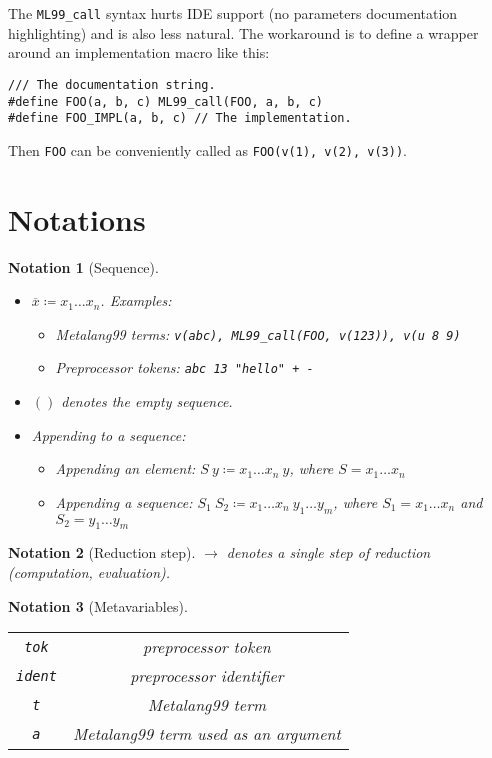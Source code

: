 \documentclass[12pt]{article}
\theoremstyle{break}
\newtheorem{notation}{Notation}
\begin{document}
The \texttt{ML99\_call} syntax hurts IDE support (no parameters documentation highlighting) and is also
less natural. The workaround is to define a wrapper around an implementation macro like this:

\begin{verbatim}
/// The documentation string.
#define FOO(a, b, c) ML99_call(FOO, a, b, c)
#define FOO_IMPL(a, b, c) // The implementation.
\end{verbatim}

Then \texttt{FOO} can be conveniently called as \texttt{FOO(v(1), v(2), v(3))}.

\section{Notations}

\begin{notation}[Sequence]
    \begin{itemize}
        \item $\overline{x} \coloneqq x_1 \ldots x_n$. Examples:
        \begin{itemize}
            \item Metalang99 terms: \texttt{v(abc), ML99\_call(FOO, v(123)), v(u 8 9)}
            \item Preprocessor tokens: \texttt{abc 13 "hello" + -}
        \end{itemize}
        \item $()$ denotes the empty sequence.
        \item Appending to a sequence:
        \begin{itemize}
            \item Appending an element: $S \ y \coloneqq x_1 \ldots x_n \ y$, where $S = x_1 \ldots x_n$
            \item Appending a sequence: $S_1 \ S_2 \coloneqq x_1 \ldots x_n \ y_1 \ldots y_m$, where $S_1 = x_1 \ldots x_n$
            and $S_2 = y_1 \ldots y_m$
        \end{itemize}
    \end{itemize}
\end{notation}

\begin{notation}[Reduction step]
    $\to$ denotes a single step of reduction (computation, evaluation).
\end{notation}

\begin{notation}[Metavariables]
    \ \\
    \begin{tabular}{|c|c|}
        \hline
        \texttt{tok} & preprocessor token \\
        \texttt{ident} & preprocessor identifier \\
        \texttt{t} & Metalang99 term \\
        \texttt{a} & Metalang99 term used as an argument \\
        \hline
    \end{tabular}
\end{notation}
\end{document}

